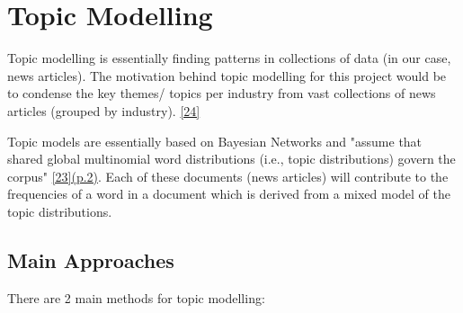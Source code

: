\section{Topic Modelling}

Topic modelling is essentially finding patterns in collections of data (in our case, news articles). The motivation behind topic modelling for this project would be to condense the key themes/ topics per industry from vast collections of news articles (grouped by industry). \hyperlink{24}{[24]}

Topic models are essentially based on Bayesian Networks and "assume that shared global multinomial word distributions (i.e., topic distributions) govern the corpus" \hyperlink{23}{[23](p.2)}.  Each of these documents (news articles) will contribute to the frequencies of a word in a document which is derived from a mixed model of the topic distributions.

\subsection{Main Approaches}

There are 2 main methods for topic modelling: 

